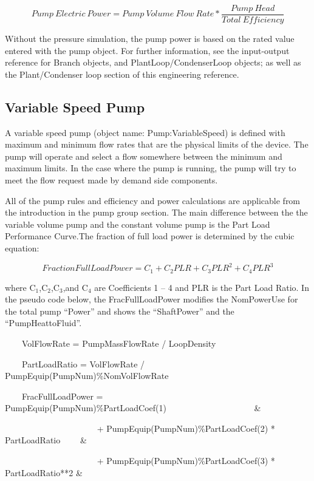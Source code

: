 \begin{equation}
Pump~Electric~Power = Pump~Volume~Flow~Rate*\frac{{Pump~Head}}{{Total~Efficiency}}
\end{equation}

Without the pressure simulation, the pump power is based on the rated value entered with the pump object. For further information, see the input-output reference for Branch objects, and PlantLoop/CondenserLoop objects; as well as the Plant/Condenser loop section of this engineering reference.

\subsection{Variable Speed Pump}\label{variable-speed-pump}

A variable speed pump (object name: Pump:VariableSpeed) is defined with maximum and minimum flow rates that are the physical limits of the device. The pump will operate and select a flow somewhere between the minimum and maximum limits. In the case where the pump is running, the pump will try to meet the flow request made by demand side components.

All of the pump rules and efficiency and power calculations are applicable from the introduction in the pump group section. The main difference between the the variable volume pump and the constant volume pump is the Part Load Performance Curve.The fraction of full load power is determined by the cubic equation:

\begin{equation}
FractionFullLoadPower = {C_1} + {C_2}PLR + {C_3}PL{R^2} + {C_4}PL{R^3}
\end{equation}

where C\(_{1}\),C\(_{2}\),C\(_{3}\),and C\(_{4}\) are Coefficients 1 -- 4 and PLR is the Part Load Ratio. In the pseudo code below, the FracFullLoadPower modifies the NomPowerUse for the total pump ``Power'' and shows the ``ShaftPower'' and the ``PumpHeattoFluid''.

~~~~VolFlowRate = PumpMassFlowRate / LoopDensity

~~~~PartLoadRatio = VolFlowRate / PumpEquip(PumpNum)\%NomVolFlowRate

~~~~FracFullLoadPower = PumpEquip(PumpNum)\%PartLoadCoef(1)~~~~~~~~~~~~~~~~~~~~ \&

~~~~~~~~~~~~~~~~~~~~~ + PumpEquip(PumpNum)\%PartLoadCoef(2) * PartLoadRatio~~~~ \&

~~~~~~~~~~~~~~~~~~~~~ + PumpEquip(PumpNum)\%PartLoadCoef(3) * PartLoadRatio**2 \&

